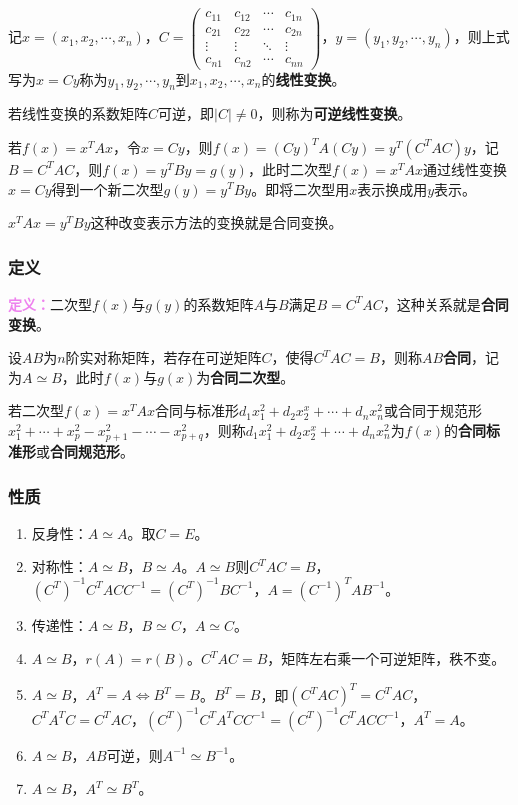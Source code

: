 \documentclass[UTF8, 12pt]{ctexart}
\begin{document}
记$x=(x_1,x_2,\cdots,x_n)$，$C=\left(\begin{array}{cccc}
c_{11} & c_{12} & \cdots & c_{1n} \\
c_{21} & c_{22} & \cdots & c_{2n} \\
\vdots & \vdots & \ddots & \vdots \\
c_{n1} & c_{n2} & \cdots & c_{nn}
\end{array}\right)$，$y=(y_1,y_2,\cdots,y_n)$，则上式写为$x=Cy$称为$y_1,y_2,\cdots,y_n$到$x_1,x_2,\cdots,x_n$的\textbf{线性变换}。

若线性变换的系数矩阵$C$可逆，即$\vert C\vert\neq0$，则称为\textbf{可逆线性变换}。

若$f(x)=x^TAx$，令$x=Cy$，则$f(x)=(Cy)^TA(Cy)=y^T(C^TAC)y$，记$B=C^TAC$，则$f(x)=y^TBy=g(y)$，此时二次型$f(x)=x^TAx$通过线性变换$x=Cy$得到一个新二次型$g(y)=y^TBy$。即将二次型用$x$表示换成用$y$表示。

$x^TAx=y^TBy$这种改变表示方法的变换就是合同变换。

\subsubsection{定义}

\textcolor{violet}{\textbf{定义：}}二次型$f(x)$与$g(y)$的系数矩阵$A$与$B$满足$B=C^TAC$，这种关系就是\textbf{合同变换}。

设$AB$为$n$阶实对称矩阵，若存在可逆矩阵$C$，使得$C^TAC=B$，则称$AB$\textbf{合同}，记为$A\simeq B$，此时$f(x)$与$g(x)$为\textbf{合同二次型}。

若二次型$f(x)=x^TAx$合同与标准形$d_1x_1^2+d_2x_2^x+\cdots+d_nx_n^2$或合同于规范形$x_1^2+\cdots+x_p^2-x_{p+1}^2-\cdots-x_{p+q}^2$，则称$d_1x_1^2+d_2x_2^x+\cdots+d_nx_n^2$为$f(x)$的\textbf{合同标准形}或\textbf{合同规范形}。

\subsubsection{性质}

\begin{enumerate}
\item 反身性：$A\simeq A$。取$C=E$。
\item 对称性：$A\simeq B$，$B\simeq A$。$A\simeq B$则$C^TAC=B$，$(C^T)^{-1}C^TACC^{-1}=(C^T)^{-1}BC^{-1}$，$A=(C^{-1})^TAB^{-1}$。
\item 传递性：$A\simeq B$，$B\simeq C$，$A\simeq C$。
\item $A\simeq B$，$r(A)=r(B)$。$C^TAC=B$，矩阵左右乘一个可逆矩阵，秩不变。
\item $A\simeq B$，$A^T=A\Leftrightarrow B^T=B$。$B^T=B$，即$(C^TAC)^T=C^TAC$，$C^TA^TC=C^TAC$，$(C^T)^{-1}C^TA^TCC^{-1}=(C^T)^{-1}C^TACC^{-1}$，$A^T=A$。
\item $A\simeq B$，$AB$可逆，则$A^{-1}\simeq B^{-1}$。
\item $A\simeq B$，$A^T\simeq B^T$。
\end{enumerate}
\end{document}
